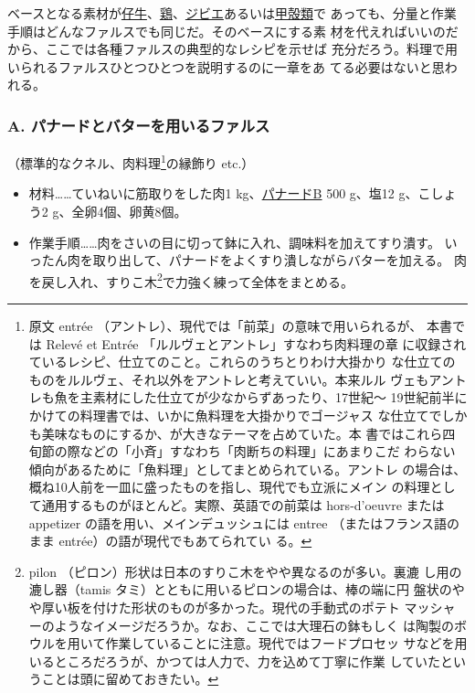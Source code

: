 
 

ベースとなる素材が\ul{仔牛}、\ul{鶏}、\ul{ジビエ}あるいは\ul{甲殻類}で
あっても、分量と作業手順はどんなファルスでも同じだ。そのベースにする素
材を代えればいいのだから、ここでは各種ファルスの典型的なレシピを示せば
充分だろう。料理で用いられるファルスひとつひとつを説明するのに一章をあ
てる必要はないと思われる。
\begin{recette}
\hypertarget{farce-a}{%
\subsubsection{A. パナードとバターを用いるファルス}\label{farce-a}}



（標準的なクネル、肉料理\footnote{原文 entrée
  （アントレ）、現代では「前菜」の意味で用いられるが、 本書では Relevé
  et Entrée 「ルルヴェとアントレ」すなわち肉料理の章
  に収録されているレシピ、仕立てのこと。これらのうちとりわけ大掛かり
  な仕立てのものをルルヴェ、それ以外をアントレと考えていい。本来ルル
  ヴェもアントレも魚を主素材にした仕立てが少なからずあったり、17世紀〜
  19世紀前半にかけての料理書では、いかに魚料理を大掛かりでゴージャス
  な仕立てでしかも美味なものにするか、が大きなテーマを占めていた。本
  書ではこれら四旬節の際などの「小斉」すなわち「肉断ちの料理」にあまりこだ
  わらない傾向があるために「魚料理」としてまとめられている。アントレ
  の場合は、概ね10人前を一皿に盛ったものを指し、現代でも立派にメイン
  の料理として通用するものがほとんど。実際、英語での前菜は hors-d'oeuvre
  または appetizer の語を用い、メインデュッシュには entree
  （またはフランス語のまま entrée）の語が現代でもあてられてい る。}の縁飾り
etc.）

\begin{itemize}
\item
  材料\ldots{}\ldots{}ていねいに筋取りをした肉1
  kg、\protect\hyperlink{panade-b}{パナードB} 500 g、塩12 g、こしょう2
  g、全卵4個、卵黄8個。
\item
  作業手順\ldots{}\ldots{}肉をさいの目に切って鉢に入れ、調味料を加えてすり潰す。
  いったん肉を取り出して、パナードをよくすり潰しながらバターを加える。
  肉を戻し入れ、すりこ木\footnote{pilon
    （ピロン）形状は日本のすりこ木をやや異なるのが多い。裏漉
    し用の漉し器（tamis タミ）とともに用いるピロンの場合は、棒の端に円
    盤状のやや厚い板を付けた形状のものが多かった。現代の手動式のポテト
    マッシャーのようなイメージだろうか。なお、ここでは大理石の鉢もしく
    は陶製のボウルを用いて作業していることに注意。現代ではフードプロセッ
    サなどを用いるところだろうが、かつては人力で、力を込めて丁寧に作業
    していたということは頭に留めておきたい。}で力強く練って全体をまとめる。
\end{itemize}


\end{recette}
